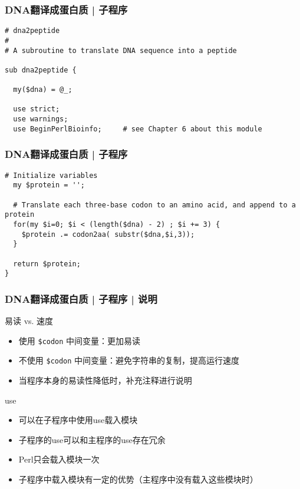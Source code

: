 \begin{frame}[fragile]
  \frametitle{DNA翻译成蛋白质 | \alert{子程序}}
\begin{lstlisting}[firstnumber=1]
# dna2peptide 
#
# A subroutine to translate DNA sequence into a peptide

sub dna2peptide {

  my($dna) = @_;

  use strict;
  use warnings;
  use BeginPerlBioinfo;     # see Chapter 6 about this module
\end{lstlisting}
\end{frame}

\begin{frame}[fragile]
  \frametitle{DNA翻译成蛋白质 | \alert{子程序}}
\begin{lstlisting}[firstnumber=13]
  # Initialize variables
  my $protein = '';

  # Translate each three-base codon to an amino acid, and append to a protein 
  for(my $i=0; $i < (length($dna) - 2) ; $i += 3) {
    $protein .= codon2aa( substr($dna,$i,3));
  }

  return $protein;
}
\end{lstlisting}
\end{frame}

\begin{frame}[fragile]
  \frametitle{DNA翻译成蛋白质 | 子程序 | \alert{说明}}
  \begin{block}{易读 vs. 速度}
    \begin{itemize}
      \item 使用 \verb|$codon| 中间变量：更加易读
      \item 不使用 \verb|$codon| 中间变量：避免字符串的复制，提高运行速度
      \item 当程序本身的易读性降低时，补充注释进行说明
    \end{itemize}
  \end{block}
  \pause
  \begin{block}{use}
    \begin{itemize}
      \item 可以在子程序中使用use载入模块
      \item 子程序的use可以和主程序的use存在冗余
      \item Perl只会载入模块一次
      \item 子程序中载入模块有一定的优势（主程序中没有载入这些模块时）
    \end{itemize}
  \end{block}
\end{frame}

